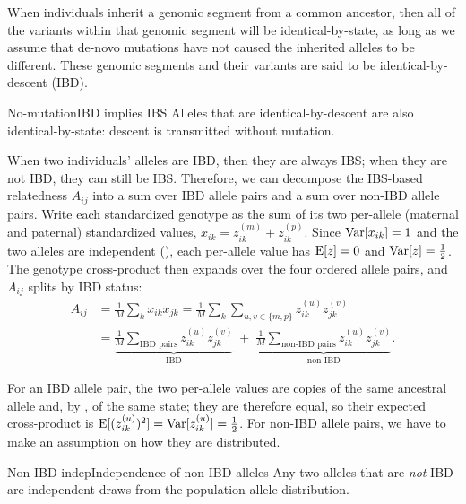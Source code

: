 \documentclass[12pt]{article}
\begin{document}
When individuals inherit a genomic segment from a common ancestor, then all of the variants within that genomic segment will be identical-by-state, as long as we assume that de-novo mutations have not caused the inherited alleles to be different.
These genomic segments and their variants are said to be identical-by-descent (IBD).

\begin{assumption}{No-mutation}{IBD implies IBS}
Alleles that are identical-by-descent are also identical-by-state: descent is transmitted without mutation.
\end{assumption}

When two individuals' alleles are IBD, then they are always IBS; when they are not IBD, they can still be IBS.
Therefore, we can decompose the IBS-based relatedness $A_{ij}$ into a sum over IBD allele pairs and a sum over non-IBD allele pairs.
Write each standardized genotype as the sum of its two per-allele (maternal and paternal) standardized values, $x_{ik} = z^{(m)}_{ik} + z^{(p)}_{ik}$.
Since $\mathrm{Var}[x_{ik}]=1$ and the two alleles are independent (), each per-allele value has $\mathrm{E}[z]=0$ and $\mathrm{Var}[z]=\tfrac12$.
The genotype cross-product then expands over the four ordered allele pairs, and $A_{ij}$ splits by IBD status:
\begin{equation}\label{eq:Adecomp}
\begin{split}
    A_{ij}
    &= \frac{1}{M}\sum_{k} x_{ik} x_{jk}
    = \frac{1}{M}\sum_{k} \sum_{u,v\in\{m,p\}} z^{(u)}_{ik} z^{(v)}_{jk} \\
    &= \underbrace{\frac{1}{M}\sum_{\text{IBD pairs}} z^{(u)}_{ik} z^{(v)}_{jk}}_{\text{IBD}}
    \;+\; \underbrace{\frac{1}{M}\sum_{\text{non-IBD pairs}} z^{(u)}_{ik} z^{(v)}_{jk}}_{\text{non-IBD}} .
\end{split}
\end{equation}

For an IBD allele pair, the two per-allele values are copies of the same ancestral allele and, by , of the same state; they are therefore equal, so their expected cross-product is $\mathrm{E}[(z^{(u)}_{ik})^2] = \mathrm{Var}[z^{(u)}_{ik}] = \tfrac12$.
For non-IBD allele pairs, we have to make an assumption on how they are distributed.

\begin{assumption}{Non-IBD-indep}{Independence of non-IBD alleles}
Any two alleles that are \emph{not} IBD are independent draws from the population allele distribution.
\end{assumption}
\end{document}
